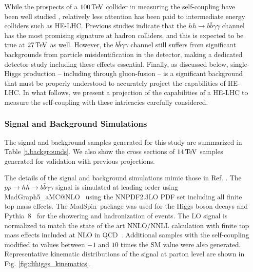 While the prospects of a $100\, {\rm TeV}$ collider in measuring the self-coupling have been well studied \cite{Contino:2016spe}, relatively less attention has been paid to intermediate energy colliders such as HE-LHC. Previous studies indicate that the $hh\rightarrow b\bar{b}\gamma\gamma$ channel has the most promising signature at hadron colliders, and this is expected to be true at $27\, {\rm TeV}$ as well. However, the $b\bar{b}\gamma\gamma$ channel still suffers from significant backgrounds from particle misidentification in the detector, making a dedicated detector study including these effects essential. Finally, as discussed below, single-Higgs production -- including through gluon-fusion -- is a significant background that must be properly understood to accurately project the capabilities of HE-LHC. In what follows, we present a projection of the capabilities of a HE-LHC to measure the self-coupling with these intricacies carefully considered.

\subsubsection{Signal and Background Simulations}

The signal and background samples generated for this study are summarized in Table \ref{t.backgrounds}. We also show the cross sections of $14\, {\rm TeV}$ samples generated for validation with previous projections. 

The details of the signal and background simulations mimic those in Ref. \cite{Homiller:2018xxx}. 
The $pp \rightarrow hh \rightarrow b\bar{b}\gamma\gamma$ signal is simulated at leading order using {\sc\small MadGraph5\_aMC@NLO}\ \cite{Alwall:2014hca, Hirschi:2015iia} using the NNPDF2.3LO PDF set \cite{Ball:2014uwa} including all finite top mass effects. The {\sc\small MadSpin}\ package \cite{Artoisenet:2012st} was used for the Higgs boson decays and {\sc\small Pythia~8}\ \cite{Sjostrand:2014zea} for the showering and hadronization of events. The LO signal is normalized to match the state of the art NNLO/NNLL calculation with finite top mass effects included at NLO in QCD~\cite{Grazzini:2018bsd}. Additional samples with the self-coupling modified to values between $-1$ and $10$ times the SM value were also generated. Representative kinematic distributions of the signal at parton level are shown in Fig. \ref{fig:dihiggs_kinematics}.

